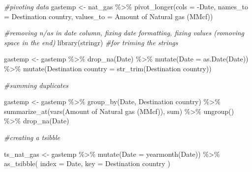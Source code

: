 \documentclass[
]{article}
\newenvironment{Shaded}{\begin{snugshade}}{\end{snugshade}}
\newcommand{\AttributeTok}[1]{\textcolor[rgb]{0.77,0.63,0.00}{#1}}
\newcommand{\CommentTok}[1]{\textcolor[rgb]{0.56,0.35,0.01}{\textit{#1}}}
\newcommand{\FunctionTok}[1]{\textcolor[rgb]{0.00,0.00,0.00}{#1}}
\newcommand{\NormalTok}[1]{#1}
\newcommand{\OtherTok}[1]{\textcolor[rgb]{0.56,0.35,0.01}{#1}}
\newcommand{\SpecialCharTok}[1]{\textcolor[rgb]{0.00,0.00,0.00}{#1}}
\newcommand{\StringTok}[1]{\textcolor[rgb]{0.31,0.60,0.02}{#1}}
\begin{document}
\begin{Shaded}
\begin{Highlighting}[]
\CommentTok{\#pivoting data}
\NormalTok{gastemp }\OtherTok{\textless{}{-}}\NormalTok{ nat\_gas }\SpecialCharTok{\%\textgreater{}\%} 
  \FunctionTok{pivot\_longer}\NormalTok{(}\AttributeTok{cols =} \SpecialCharTok{{-}}\NormalTok{Date,}
               \AttributeTok{names\_to =} \StringTok{\textquotesingle{}Destination country\textquotesingle{}}\NormalTok{,}
               \AttributeTok{values\_to =} \StringTok{\textquotesingle{}Amount of Natural gas (MMcf)\textquotesingle{}}\NormalTok{)}

\CommentTok{\#removing n/as in date column, fixing date formatting, fixing values (romoving space in the end)}
\FunctionTok{library}\NormalTok{(stringr) }\CommentTok{\#for triming the strings}

\NormalTok{gastemp }\OtherTok{\textless{}{-}}\NormalTok{ gastemp }\SpecialCharTok{\%\textgreater{}\%} 
  \FunctionTok{drop\_na}\NormalTok{(Date) }\SpecialCharTok{\%\textgreater{}\%} 
  \FunctionTok{mutate}\NormalTok{(}\AttributeTok{Date =} \FunctionTok{as.Date}\NormalTok{(Date)) }\SpecialCharTok{\%\textgreater{}\%} 
  \FunctionTok{mutate}\NormalTok{(}\StringTok{\textasciigrave{}}\AttributeTok{Destination country}\StringTok{\textasciigrave{}} \OtherTok{=} \FunctionTok{str\_trim}\NormalTok{(}\StringTok{\textasciigrave{}}\AttributeTok{Destination country}\StringTok{\textasciigrave{}}\NormalTok{))}


\CommentTok{\#summing duplicates }

\NormalTok{gastemp }\OtherTok{\textless{}{-}}\NormalTok{ gastemp }\SpecialCharTok{\%\textgreater{}\%}
  \FunctionTok{group\_by}\NormalTok{(Date, }\StringTok{\textasciigrave{}}\AttributeTok{Destination country}\StringTok{\textasciigrave{}}\NormalTok{) }\SpecialCharTok{\%\textgreater{}\%}
  \FunctionTok{summarize\_at}\NormalTok{(}\FunctionTok{vars}\NormalTok{(}\StringTok{\textasciigrave{}}\AttributeTok{Amount of Natural gas (MMcf)}\StringTok{\textasciigrave{}}\NormalTok{), sum) }\SpecialCharTok{\%\textgreater{}\%}
  \FunctionTok{ungroup}\NormalTok{() }\SpecialCharTok{\%\textgreater{}\%} 
  \FunctionTok{drop\_na}\NormalTok{(Date)}

\CommentTok{\#creating a tsibble}

\NormalTok{ts\_nat\_gas }\OtherTok{\textless{}{-}}\NormalTok{ gastemp }\SpecialCharTok{\%\textgreater{}\%}
  \FunctionTok{mutate}\NormalTok{(}\AttributeTok{Date =} \FunctionTok{yearmonth}\NormalTok{(Date)) }\SpecialCharTok{\%\textgreater{}\%} 
  \FunctionTok{as\_tsibble}\NormalTok{(}
    \AttributeTok{index =}\NormalTok{ Date,}
    \AttributeTok{key =} \StringTok{\textasciigrave{}}\AttributeTok{Destination country}\StringTok{\textasciigrave{}}
\NormalTok{  )}


\end{Highlighting}
\end{Shaded}
\end{document}
